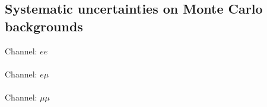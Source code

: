 \subsection{Systematic uncertainties on Monte Carlo backgrounds}
\begin{centering}
\tiny
Channel: $ee$ \\

\\
Channel: $e \mu$ \\

\\
Channel: $\mu \mu$ \\

\\
\label{tab:systematicsBG}
\end{centering}

